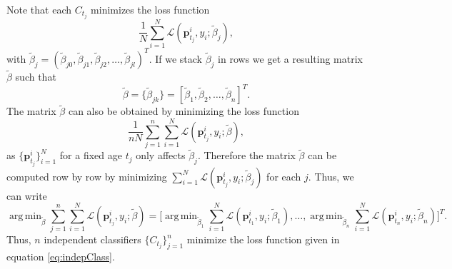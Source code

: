 \documentclass[a4paper,11pt]{article}
\DeclareMathOperator*{\argmin}{arg\,min}
\begin{document}
Note that each $C_{t_j}$ minimizes the loss function
\[
	\frac{1}{N} \sum_{i=1}^N \mathscr{L} ( \bm{p}^i_{t_j},y_i;\tilde{\beta}_j )  ,
\]
with $\tilde{\beta}_j = ( \tilde{\beta}_{j0}, \tilde{\beta}_{j1}, \tilde{\beta}_{j2}, \dots, \tilde{\beta}_{jl})^T$. If we stack $\tilde{\beta}_j$ in rows we get a resulting matrix  $\tilde{\beta}$ such that
\[
	\tilde{\beta} = \{ \tilde{\beta}_{jk} \} = \left[\tilde{\beta}_1, \tilde{\beta}_2, \ldots, \tilde{\beta}_n  \right]^T .
\]
The matrix $\tilde{\beta}$ can also be obtained by minimizing the loss function
\begin{equation}\label{eq:indepClass}
	\frac{1}{nN} \sum_{j=1}^n \sum_{i=1}^N  \mathscr{L} ( \bm{p}^i_{t_j},y_i;\tilde{\beta})  ,
\end{equation}
as $\{\bm{p}^i_{t_j}\}_{i=1}^N$ for a fixed age $t_j$ only affects $\tilde{\beta}_j$. Therefore the matrix $\tilde{\beta}$ can be computed row by row by minimizing $\sum_{i=1}^N \mathscr{L} \left( \bm{p}^i_{t_j},y_i;\tilde{\beta}_j \right)$ for each $j$. Thus, we can write
\begin{equation}\label{eq:4_2}
	\argmin_{\tilde{\beta}} \sum_{j=1}^n \sum_{i=1}^N \mathscr{L} ( \bm{p}^i_{t_j},y_i;\tilde{\beta} ) = \bigg[\argmin_{\tilde{\beta}_1} \sum_{i=1}^N \mathscr{L} ( \bm{p}^i_{t_1},y_i;\tilde{\beta}_1 ), \dots ,\argmin_{\tilde{\beta}_n} \sum_{i=1}^N \mathscr{L} ( \bm{p}^i_{t_n},y_i;\tilde{\beta}_n ) \bigg]^T \!\!.
\end{equation}
Thus, $n$ independent classifiers $\{C_{t_j}\}_{j=1}^n$ minimize the loss function given in equation \eqref{eq:indepClass}.
\end{document}
